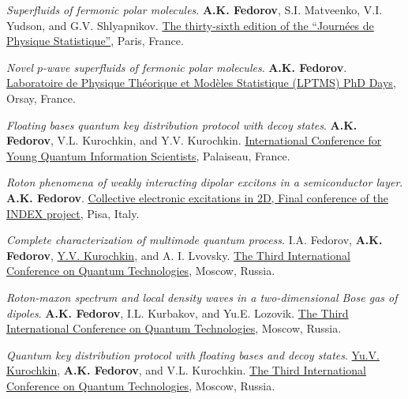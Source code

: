 \documentclass[10pt,a4paper,sans]{moderncv}
\begin{document}
	{\textit{Superfluids of fermonic polar molecules}.
	\textbf{A.K. Fedorov}, S.I. Matveenko, V.I. Yudson, and G.V. Shlyapnikov.
	\textcolor{blue}{\href{http://comphys.ethz.ch:8080/jstat/home}{The thirty-sixth edition of the ``Journ\'{e}es de Physique Statistique''}}, Paris, France.}
	
	{\textit{Novel $p$-wave superfluids of fermonic polar molecules}.
	\textbf{A.K. Fedorov}.
	\textcolor{blue}{\href{http://lptms.u-psud.fr}{Laboratoire de Physique Th{\'e}orique et Mod{\`e}les Statistique (LPTMS) PhD Days}}, Orsay, France.}

	{\textit{Floating bases quantum key distribution protocol with decoy states}.
	\textbf{A.K. Fedorov}, V.L. Kurochkin, and Y.V. Kurochkin.
	\textcolor{blue}{\href{http://yqis15.sciencesconf.org}{International Conference for Young Quantum Information Scientists}}, Palaiseau, France.}

	{\textit{Roton phenomena of weakly interacting dipolar excitons in a semiconductor layer}.
	\textbf{A.K. Fedorov}.
	\textcolor{blue}{\href{http://web.nano.cnr.it/CEE2D/}{Collective electronic excitations in 2D, Final conference of the INDEX project}}, Pisa, Italy.}

	{\textit{Complete characterization of multimode quantum process}.
	I.A. Fedorov, \textbf{A.K. Fedorov}, \underline{Y.V. Kurochkin}, and A. I. Lvovsky.
	\textcolor{blue}{\href{http://conference.rqc.ru}{The Third International Conference on Quantum Technologies}}, Moscow, Russia.}

	{\textit{Roton-maxon spectrum and local density waves in a two-dimensional Bose gas of dipoles}.
	\textbf{A.K. Fedorov}, I.L. Kurbakov, and Yu.E. Lozovik.
	\textcolor{blue}{\href{http://conference.rqc.ru}{The Third International Conference on Quantum Technologies}}, Moscow, Russia.}

	{\textit{Quantum key distribution protocol with floating bases and decoy states}.
	\underline{Yu.V. Kurochkin}, \textbf{A.K. Fedorov}, and V.L. Kurochkin.
	\textcolor{blue}{\href{http://conference.rqc.ru}{The Third International Conference on Quantum Technologies}}, Moscow, Russia.}
	
\end{document}

